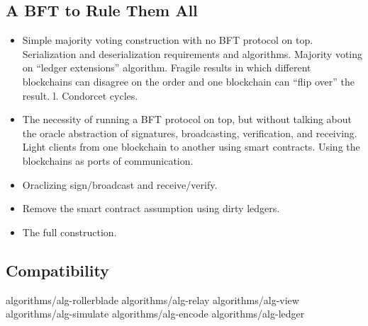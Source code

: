 \subsection{A BFT to Rule Them All}\label{sec:construction-bft}

\begin{itemize}
  \item Simple majority voting construction with no BFT protocol on top. Serialization and deserialization requirements and algorithms. Majority voting on ``ledger extensions'' algorithm. Fragile results in which different blockchains can disagree on the order and one blockchain can ``flip over'' the result. l. Condorcet cycles.
  \item The necessity of running a BFT protocol on top, but without talking about the oracle abstraction of signatures, broadcasting, verification, and receiving. Light clients from one blockchain to another using smart contracts. Using the blockchains as ports of communication.
  \item Oraclizing sign/broadcast and receive/verify.
  \item Remove the smart contract assumption using dirty ledgers.
  \item The full construction.
\end{itemize}

\subsection{Compatibility}\label{sec:compatibility}

{algorithms/alg-rollerblade}
{algorithms/alg-relay}
{algorithms/alg-view}
{algorithms/alg-simulate}
{algorithms/alg-encode}
{algorithms/alg-ledger}
